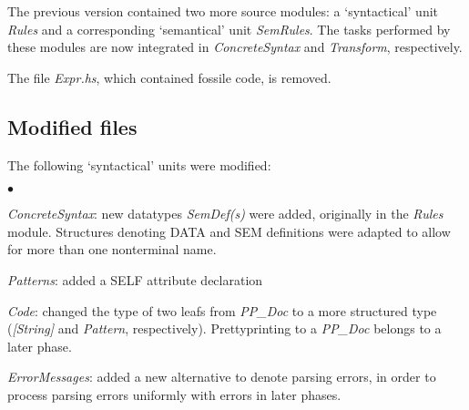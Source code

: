 \documentclass[twoside]{article}
\newenvironment{itize}{\begin{list}{$\bullet$}{\parsep=0pt\parskip=0pt\topsep=0pt\itemsep=0pt}}{\end{list}}
\begin{document}
The previous version contained two more source modules:
a `syntactical' unit {\em Rules} and a corresponding `semantical' unit {\em SemRules}.
The tasks performed by these modules are now integrated in
{\em ConcreteSyntax} and {\em Transform}, respectively.

The file {\em Expr.hs}, which contained fossile code, is removed.

\subsection{Modified files}

The following `syntactical' units were modified:
\begin{itize}
\item {\em ConcreteSyntax}:
      new datatypes {\em SemDef(s)} were added, originally in the {\em Rules} module.
      Structures denoting DATA and SEM definitions were adapted to allow for more than one nonterminal name.
\item {\em Patterns}:
      added a SELF attribute declaration
\item {\em Code}:
      changed the type of two leafs from {\em PP\_Doc} to a more structured type
      ({\em [String]} and {\em Pattern}, respectively).
      Prettyprinting to a {\em PP\_Doc} belongs to a later phase.
\item {\em ErrorMessages}:
      added a new alternative to denote parsing errors,
      in order to process parsing errors uniformly with errors in later phases.
\end{itize}
\end{document}
